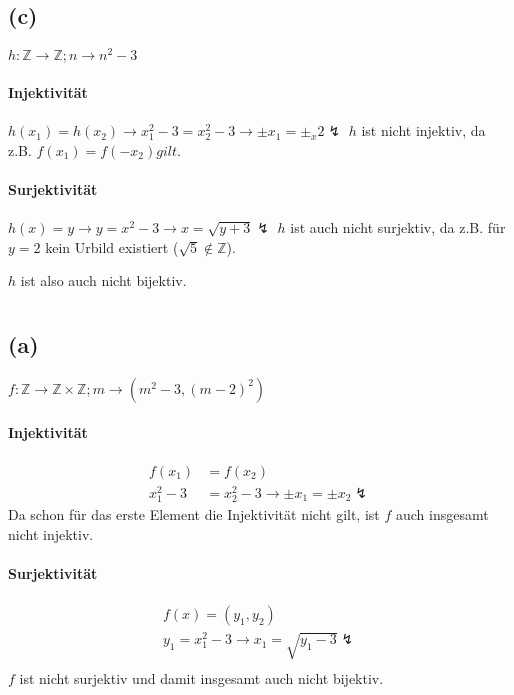 \documentclass[11pt,a4paper]{article}
\begin{document}
\subsection{(c)}
$h : \mathbb{Z} \rightarrow \mathbb{Z}; n \rightarrow n^2-3$

\paragraph{Injektivität}
$h(x_1) = h(x_2) \rightarrow x_1^2-3 = x_2^2-3 \rightarrow \pm x_1 = \pm _x2 \lightning$
$h$ ist nicht injektiv, da z.B. $f(x_1) = f(-x_2) gilt.$

\paragraph{Surjektivität}
$h(x) = y \rightarrow y = x^2-3 \rightarrow x = \sqrt{y+3} \lightning$
$h$ ist auch nicht surjektiv, da z.B. für $y=2$ kein Urbild existiert ($\sqrt{5} \notin \mathbb{Z}$).

$h$ ist also auch nicht bijektiv.


\section{}

\subsection{(a)}
$f : \mathbb{Z} \rightarrow \mathbb{Z} \times \mathbb{Z}; m \rightarrow (m^2-3, (m-2)^2)$

\paragraph{Injektivität}
\begin{align*}
f(x_1) &= f(x_2)\\
x_1^2-3 &= x_2^2-3 \rightarrow \pm x_1 = \pm x_2 \lightning
\end{align*}
Da schon für das erste Element die Injektivität nicht gilt, ist $f$ auch insgesamt nicht injektiv.

\paragraph{Surjektivität}
\begin{align*}
f(x) = (y_1,y_2)\\
y_1 = x_1^2-3 \rightarrow x_1 = \sqrt{y_1-3} \lightning\\
\end{align*}
$f$ ist nicht surjektiv und damit insgesamt auch nicht bijektiv.
\end{document}
